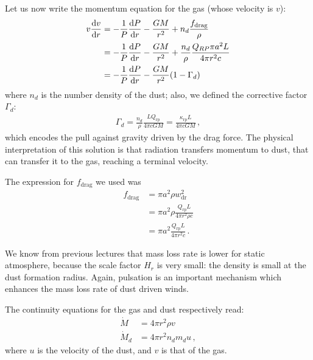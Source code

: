 \documentclass[main.tex]{subfiles}
\begin{document}
Let us now write the momentum equation for the gas (whose velocity is \(v\)): 
%
\begin{subequations}
\begin{align}
v \dv{v}{r}
& =-\frac{1}{P} \dv{P}{r} - \frac{GM}{r^2}+n_d\frac{f_{\text{drag}}}{\rho} \\
&= -\frac{1}{P} \dv{P}{r} - \frac{GM}{r^2}+\frac{n_d}{\rho }\frac{Q_{RP}\pi a^2 L}{4\pi r^2 c}  \\
&=-\frac{1}{P} \dv{P}{r} - \frac{GM}{r^2}(1-\Gamma_d)
\end{align}
\end{subequations}
%
where \(n_d\) is the number density of the dust; also, we defined the corrective factor $\Gamma_d$: 
%
\begin{align}
\Gamma_{d} = \frac{n_d}{\rho } \frac{L Q _{\text{rp}} }{4 \pi c GM} = \frac{\kappa _{\text{rp}} L }{4 \pi c GM}
\,,
\end{align}
%
which encodes the pull against gravity driven by the drag force. 
The physical interpretation of this solution is that radiation transfers momentum to dust, that can transfer it to the gas, reaching a terminal velocity.

The expression for \(f _{\text{drag}}\) we used was 
%
\begin{subequations}
\begin{align}
f _{\text{drag}} &= \pi a^2 \rho w _{\text{dr}}^2  \\
&= \pi a^2 \rho \frac{Q _{\text{rp}} L}{4 \pi r^2 \rho  c }  \\
&= \pi a^2 \frac{Q _{\text{rp}} L}{4 \pi r^2 c}
\,.
\end{align}
\end{subequations}

We know from previous lectures that mass loss rate is lower for static atmosphere, because the scale factor $H_r$ is very small: the density is small at the dust formation radius. 
Again, pulsation is an important mechanism which enhances the mass loss rate of dust driven winds.

The continuity equations for the gas and dust respectively read:
\begin{subequations}
\begin{align}
    \dot M&= 4\pi r^2 \rho v\\
    \dot M_d&=4\pi r^2 n_d m_d u\,,
\end{align}
\end{subequations}
%
where \(u\) is the velocity of the dust, and \(v\) is that of the gas.
\end{document}
